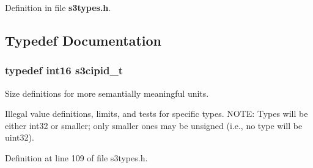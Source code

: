 Definition in file {\bf s3types.\-h}.



\subsection{Typedef Documentation}
\subsubsection[{s3cipid\-\_\-t}]{\setlength{\rightskip}{0pt plus 5cm}typedef int16 {\bf s3cipid\-\_\-t}}\label{s3types_8h_ae5f70241ce62a79747f0611029a6409d}


Size definitions for more semantially meaningful units. 

Illegal value definitions, limits, and tests for specific types. N\-O\-T\-E\-: Types will be either int32 or smaller; only smaller ones may be unsigned (i.\-e., no type will be uint32). 

Definition at line 109 of file s3types.\-h.

